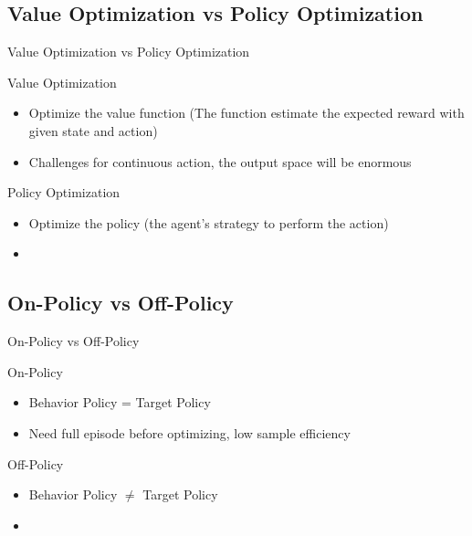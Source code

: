 \subsection{Value Optimization vs Policy Optimization}
\begin{frame}{Value Optimization vs Policy Optimization}
\begin{block}{Value Optimization}
\begin{itemize}
    \item Optimize the value function (The function estimate the expected reward with given state and action)
    \item \alert {Challenges for continuous action,  the output space will be enormous}
\end{itemize}
\end{block}
\begin{block}{Policy Optimization}
    \begin{itemize}
        \item Optimize the policy (the agent's strategy to perform the action)
        \item \color{blue}{Works well for continuous action}
    \end{itemize}

\end{block}
\end{frame}

\subsection{On-Policy vs Off-Policy}

\begin{frame}{On-Policy vs Off-Policy}
    \begin{block}{On-Policy}
        \begin{itemize}
        \item Behavior Policy =  Target Policy
        \item \alert{Need full episode before optimizing, low sample efficiency}
    \end{itemize}
    \end{block}
        \begin{block}{Off-Policy}
        \begin{itemize}
        \item Behavior Policy $\neq$ Target Policy
        \item \color{blue}{Can update policy afer each step, high sample efficiency with experience replay}
    \end{itemize}
    \end{block}
\end{frame}


